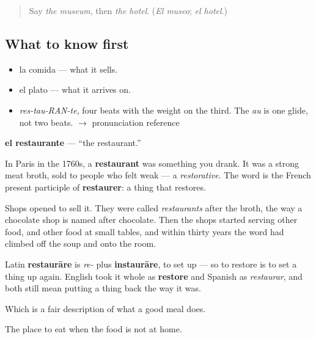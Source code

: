 \label{lesson:ES-C354-restaurante}



\begin{quote}
Say \emph{the museum}, then \emph{the hotel}. (\emph{El museo}; \emph{el hotel}.)
\end{quote}

\subsection*{What to know first}
\begin{itemize}
\raggedright
  \item la comida — what it sells.
  \item el plato — what it arrives on.
\end{itemize}

\begin{sounds}
\begin{itemize}
\raggedright
  \item \emph{res-tau-RAN-te}, four beats with the weight on the third. The \emph{au} is one glide, not two beats. $\to$ pronunciation reference
\end{itemize}
\end{sounds}

\begin{cousinweb}
\textbf{el restaurante} — \textquotedblleft{}the restaurant.\textquotedblright{}

In Paris in the 1760s, a \textbf{restaurant} was something you drank. It was a strong meat broth, sold to people who felt weak — a \emph{restorative}. The word is the French present participle of \textbf{restaurer}: a thing that restores.

Shops opened to sell it. They were called \emph{restaurants} after the broth, the way a chocolate shop is named after chocolate. Then the shops started serving other food, and other food at small tables, and within thirty years the word had climbed off the soup and onto the room.

Latin \textbf{restaurāre} is \emph{re-} plus \textbf{instaurāre}, to set up — so to restore is to set a thing up again. English took it whole as \textbf{restore} and Spanish as \emph{restaurar}, and both still mean putting a thing back the way it was.

Which is a fair description of what a good meal does.
\end{cousinweb}

\begin{grammarlens}[title={What you've built}]
The place to eat when the food is not at home.
\end{grammarlens}

